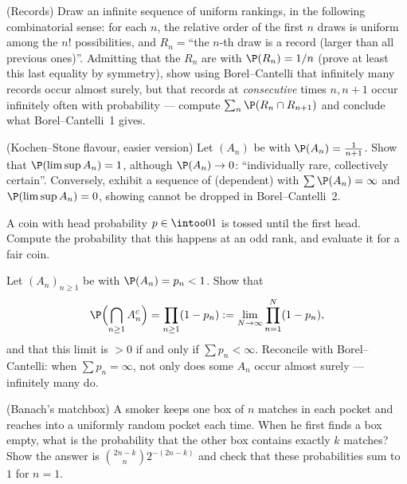 \begin{exercise}[$\star\star\star$]\label{exo:b2:proba:7}
(Records) Draw an infinite sequence of  uniform
rankings, in the following combinatorial sense: for each $n$, the
relative order of the first $n$ draws is uniform among the $n!$
possibilities, and $R_n = {}$``the $n$-th draw is a record (larger
than all previous ones)''. Admitting that the  $R_n$ are
 with $\P(R_n) = 1/n$ (prove at least this last
equality by symmetry), show using Borel--Cantelli that infinitely
many records occur almost surely, but that records at
\emph{consecutive} times $n, n+1$ occur infinitely often with
probability --- compute $\sum_n \P(R_n \cap R_{n+1})$ and
conclude what Borel--Cantelli~1 gives.
\end{exercise}

\begin{exercise}[$\star\star\star$]\label{exo:b2:proba:8}
(Kochen--Stone flavour, easier version) Let $(A_n)$ be  with $\P(A_n) = \frac{1}{n+1}$. Show that
$\P(\limsup A_n) = 1$, although $\P(A_n) \to 0$: ``individually
rare, collectively certain''. Conversely, exhibit a sequence of
(dependent)  with $\sum\P(A_n) = \infty$ and
$\P(\limsup A_n) = 0$, showing  cannot be dropped in
Borel--Cantelli~2.
\end{exercise}

\begin{exercise}[$\star$]\label{exo:b2:proba:9}
A coin with head probability $p \in \intoo01$ is tossed until
the first head. Compute the probability that this happens at
an odd rank, and evaluate it for a fair coin.
\end{exercise}

\begin{exercise}[$\star\star$]\label{exo:b2:proba:10}
Let $(A_n)_{n\geq1}$ be  with $\P(A_n) =
p_n < 1$. Show that
\[
\P\Bigl(\bigcap_{n\geq1}A_n^c\Bigr)
= \prod_{n\geq1}(1 - p_n)
:= \lim_{N\to\infty}\prod_{n=1}^N(1 - p_n),
\]
and that this limit is $> 0$ if and only if $\sum p_n <
\infty$. Reconcile with Borel--Cantelli: when $\sum p_n =
\infty$, not only does some $A_n$ occur almost surely ---
infinitely many do.
\end{exercise}

\begin{exercise}[$\star\star$]\label{exo:b2:proba:11}
(Banach's matchbox) A smoker keeps one box of $n$ matches in
each pocket and reaches into a uniformly random pocket each
time. When he first finds a box empty, what is the probability
that the other box contains exactly $k$ matches? Show the
answer is $\binom{2n-k}{n}2^{-(2n-k)}$ and check that these
probabilities sum to $1$ for $n = 1$.
\end{exercise}

